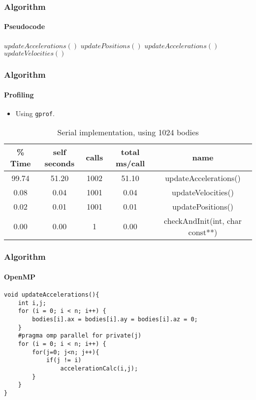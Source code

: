 \begin{frame}[fragile]
	\frametitle{Algorithm}
	\framesubtitle{Pseudocode}
	\begin{center}
		\begin{algorithmic}
			\STATE $updateAccelerations()$
			    \STATE $updatePositions()$
			    \STATE $updateAccelerations()$
			    \STATE $updateVelocities()$
			\ENDFOR
		\end{algorithmic}
	\end{center}
\end{frame}

\begin{frame}[fragile]
    \frametitle{Algorithm}
    \framesubtitle{Profiling}
     \begin{itemize}
         \item Using \texttt{gprof}.
     \end{itemize}
     \begin{table}[h!t]
        \centering
        \scriptsize
        \begin{tabular}{|c|c|c|c|c|}
           \hline
           {\bf \% Time } & {\bf self seconds} & {\bf calls} & {\bf total ms/call} & {\bf name} \\\hline
             99.74   &  51.20   &  1002   &  51.10  & updateAccelerations() \\\hline
              0.08   &   0.04   &  1001   &   0.04  & updateVelocities()\\\hline
              0.02   &   0.01   &  1001   &   0.01  & updatePositions()\\\hline
              0.00   &   0.00   &     1   &   0.00  & checkAndInit(int, char const**)\\\hline
        \end{tabular}
        \caption{Serial implementation, using 1024 bodies}
     \end{table}
\end{frame}


\begin{frame}[fragile]
\frametitle{Algorithm}
\framesubtitle{OpenMP}
\begin{lstlisting}[style=C]
void updateAccelerations(){
    int i,j;
    for (i = 0; i < n; i++) {
        bodies[i].ax = bodies[i].ay = bodies[i].az = 0;
    }
    #pragma omp parallel for private(j)
    for (i = 0; i < n; i++) {
        for(j=0; j<n; j++){
            if(j != i)
                accelerationCalc(i,j);
        }
    }
}
\end{lstlisting}
\end{frame}

